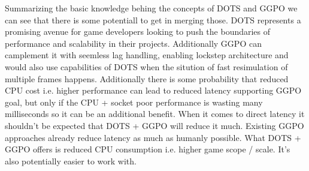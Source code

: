 Summarizing the basic knowledge behing the concepts of DOTS and GGPO we can see that there is some potentiall to get in merging those. DOTS represents a promising avenue for game developers looking to push the boundaries of performance and scalability in their projects. Additionally GGPO can camplement it with seemless lag handling, enabling lockstep architecture and would also use capabilities of DOTS when the sitution of fast resimulation of multiple frames happens.
Additionally there is some probability that reduced CPU cost i.e. higher performance can lead to reduced latency supporting GGPO goal, but only if the CPU + socket poor performance is wasting many milliseconds so it can be an additional benefit. When it comes to direct latency it shouldn't be expected that DOTS + GGPO will reduce it much. Existing GGPO approaches already reduce latency as much as humanly possible. What DOTS + GGPO offers is reduced CPU consumption i.e. higher game scope / scale. It's also potentially easier to work with.




